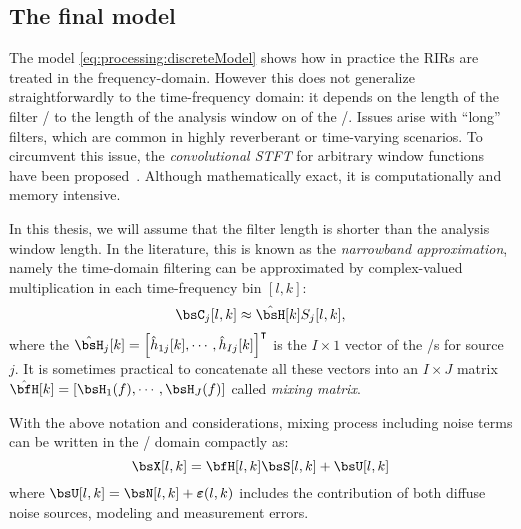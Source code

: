 \begin{figure}[t]
    \begin{fullwidth}
    \centering
        
    \end{fullwidth}
\end{figure}


\subsection{The final model}\label{subsec:processing:model:stft}
The model \eqref{eq:processing:discreteModel} shows how in practice the RIRs are treated in the frequency-domain.
However this does not generalize straightforwardly to the time-frequency domain:
it depends on the length of the filter \wrt/ to the length of the analysis window on of the \STFT/.
Issues arise with ``long'' filters, which are common in highly reverberant or time-varying scenarios.
To circumvent this issue, the \textit{convolutional STFT} for arbitrary window functions have been proposed~.
Although mathematically exact, it is computationally and memory intensive.

In this thesis, we will assume that the filter length is shorter than the analysis window length.
In the literature, this is known as the \textit{narrowband approximation}, namely the time-domain filtering can be approximated by complex-valued multiplication in each time-frequency bin $[l,k]$:
\begin{equation}
    \IMGS_j[l,k] \approx \hat{\FLTS}[k] \SRC_j[l,k]
    ,
\end{equation}
where the $\hat{\FLTS}_j[k] = \ktranspose{\klist{\hat{\flt}_{1j}[k], \cdots, \hat{\flt}_{Ij}[k]}}$ is the $I \times 1$ vector of the \RTF/s for source $j$.
It is sometimes practical to concatenate all these vectors into an $I \times J$ matrix $\hat{\FLTSS}[k] = \klist{\FLTS_1(f),\cdots,\FLTS_J(f)}$ called \textit{mixing matrix}.

With the above notation and considerations, mixing process including noise terms can be written in the \STFT/ domain compactly as:
\begin{equation}\label{eq:processing:model:stfs}
    \MICS[l,k] = \FLTSS[l,k] \SRCS[l,k] + \bsU[l,k]
\end{equation}
where $\bsU[l,k] = \bsN[l,k] + \boldsymbol{\varepsilon}(l,k)$ includes the contribution of both diffuse noise sources, modeling and measurement errors.

